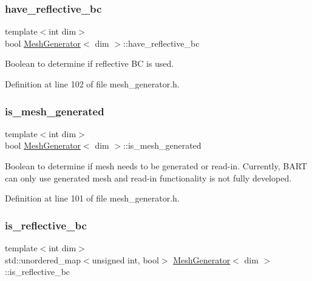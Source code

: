 \subsubsection{\texorpdfstring{have\+\_\+reflective\+\_\+bc}{have\_reflective\_bc}}
{\footnotesize\ttfamily template$<$int dim$>$ \\
bool \hyperlink{class_mesh_generator}{Mesh\+Generator}$<$ dim $>$\+::have\+\_\+reflective\+\_\+bc\hspace{0.3cm}{\ttfamily [private]}}



Boolean to determine if reflective BC is used. 



Definition at line 102 of file mesh\+\_\+generator.\+h.

\mbox{\label{class_mesh_generator_ad2e8abde741e4c291741cf4ee790e0e2}} 
\subsubsection{\texorpdfstring{is\+\_\+mesh\+\_\+generated}{is\_mesh\_generated}}
{\footnotesize\ttfamily template$<$int dim$>$ \\
bool \hyperlink{class_mesh_generator}{Mesh\+Generator}$<$ dim $>$\+::is\+\_\+mesh\+\_\+generated\hspace{0.3cm}{\ttfamily [private]}}

Boolean to determine if mesh needs to be generated or read-\/in. Currently, B\+A\+RT can only use generated mesh and read-\/in functionality is not fully developed. 

Definition at line 101 of file mesh\+\_\+generator.\+h.

\mbox{\label{class_mesh_generator_a5a6820b74d7cef07596e1d28a8bad8aa}} 
\subsubsection{\texorpdfstring{is\+\_\+reflective\+\_\+bc}{is\_reflective\_bc}}
{\footnotesize\ttfamily template$<$int dim$>$ \\
std\+::unordered\+\_\+map$<$unsigned int, bool$>$ \hyperlink{class_mesh_generator}{Mesh\+Generator}$<$ dim $>$\+::is\+\_\+reflective\+\_\+bc\hspace{0.3cm}{\ttfamily [private]}}



